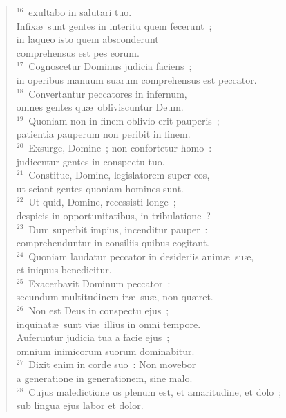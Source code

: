 \begin{flushleft}
\begin{verse}
${}^{16}$~exultabo in salutari tuo.\\ Infix\ae\ sunt gentes in interitu quem fecerunt~;\\ in laqueo isto quem absconderunt\\ comprehensus est pes eorum.\\
${}^{17}$~Cognoscetur Dominus judicia faciens~;\\ in operibus manuum suarum comprehensus est peccator.\\
${}^{18}$~Convertantur peccatores in infernum,\\ omnes gentes qu\ae\ obliviscuntur Deum.\\
${}^{19}$~Quoniam non in finem oblivio erit pauperis~;\\ patientia pauperum non peribit in finem.\\
${}^{20}$~Exsurge, Domine~; non confortetur homo~:\\ judicentur gentes in conspectu tuo.\\
${}^{21}$~Constitue, Domine, legislatorem super eos,\\ ut sciant gentes quoniam homines sunt.\\
${}^{22}$~Ut quid, Domine, recessisti longe~;\\ despicis in opportunitatibus, in tribulatione~?\\
${}^{23}$~Dum superbit impius, incenditur pauper~:\\ comprehenduntur in consiliis quibus cogitant.\\
${}^{24}$~Quoniam laudatur peccator in desideriis anim\ae\ su\ae ,\\ et iniquus benedicitur.\\
${}^{25}$~Exacerbavit Dominum peccator~:\\ secundum multitudinem ir\ae\ su\ae , non qu\ae ret.\\
${}^{26}$~Non est Deus in conspectu ejus~;\\ inquinat\ae\ sunt vi\ae\ illius in omni tempore.\\ Auferuntur judicia tua a facie ejus~;\\ omnium inimicorum suorum dominabitur.\\
${}^{27}$~Dixit enim in corde suo~: Non movebor\\ a generatione in generationem, sine malo.\\
${}^{28}$~Cujus maledictione os plenum est, et amaritudine, et dolo~;\\ sub lingua ejus labor et dolor.\\

\end{verse}
\end{flushleft}
